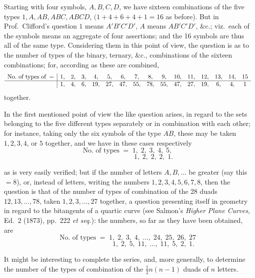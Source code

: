\documentclass[11pt,a4paper]{article}
\begin{document}
\medskip

Starting with four symbols, $A, B, C, D$, we have sixteen combinations of the five types $1, A, AB, ABC, ABCD$, $(1 + 4 + 6 + 4 + 1 = 16$ as before). But in Prof.\ Clifford's question $1$ means $A'B'C'D'$, $A$ means $AB'C'D'$, \&c.; viz.\ each of the symbols means an aggregate of four assertions; and the 16 symbols are thus all of the same type. Considering them in this point of view, the question is as to the number of types of the binary, ternary, \&c., combinations of the sixteen combinations; for, according as these are combined,
\[
\begin{array}{l|ccccccccccccccc}
\text{No.\ of types of}\;= & 1, & 2, & 3, & 4, & 5, & 6, & 7, & 8, & 9, & 10, & 11, & 12, & 13, & 14, & 15\\
\hline
 & 1, & 4, & 6, & 19, & 27, & 47, & 55, & 78, & 55, & 47, & 27, & 19, & 6, & 4, & 1
\end{array}
\]
together.

\medskip

In the first mentioned point of view the like question arises, in regard to the sets belonging to the five different types separately or in combination with each other; for instance, taking only the six symbols of the type $AB$, these may be taken $1, 2, 3, 4$, or $5$ together, and we have in these cases respectively
\[
\text{No.\ of types}\;=\; 1,\; 2,\; 3,\; 4,\; 5,
\]
\[
\phantom{\text{No.\ of types}\;=\;}\; 1,\; 2,\; 2,\; 2,\; 1.
\]

\newpage


\noindent as is very easily verified; but if the number of letters $A, B, \ldots$ be greater (say this $= 8$), or, instead of letters, writing the numbers $1, 2, 3, 4, 5, 6, 7, 8$, then the question is that of the number of types of combination of the 28 duads $12, 13, \ldots, 78$, taken $1, 2, 3, \ldots, 27$ together, a question presenting itself in geometry in regard to the bitangents of a quartic curve (see Salmon's \emph{Higher Plane Curves}, Ed.~2 (1873), pp.~222 \emph{et seq.}): the numbers, so far as they have been obtained, are
\[
\text{No.\ of types}\;=\; 1,\; 2,\; 3,\; 4,\; \ldots,\; 24,\; 25,\; 26,\; 27
\]
\[
\phantom{\text{No.\ of types}\;=\;}\; 1,\; 2,\; 5,\; 11,\; \ldots,\; 11,\; 5,\; 2,\; 1.
\]

\medskip

It might be interesting to complete the series, and, more generally, to determine the number of the types of combination of the $\tfrac{1}{2}n(n - 1)$ duads of $n$ letters.
\end{document}
